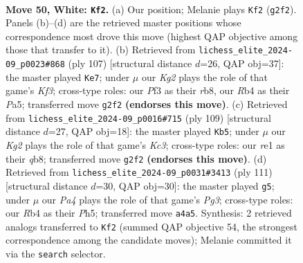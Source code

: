 \documentclass[11pt]{article}
\begin{document}
\clearpage

\begin{figure}[p]\centering
\begin{subfigure}{0.46\textwidth}\centering
\resizebox{\linewidth}{!}{%
\newchessgame
\chessboard[
  setfen={8/1R3p2/p3pk2/8/PR2P3/5P1P/6K1/4r3 w - - 6 50},
  showmover=false,
  pgfstyle=straightmove, color=movearrow, markmove={g2-f2}
]}
\caption{}
\end{subfigure}\hfill
\begin{subfigure}{0.46\textwidth}\centering
\resizebox{\linewidth}{!}{%
\newchessgame
\chessboard[
  setfen={1R6/8/5k2/p3prp1/8/r6P/4RPK1/8 b - - 7 54},
  showmover=false,
  pgfstyle=straightmove, color=movearrow, markmove={f6-e7}
]}
\caption{}
\end{subfigure}
\\[4pt]
\begin{subfigure}{0.46\textwidth}\centering
\resizebox{\linewidth}{!}{%
\newchessgame
\chessboard[
  setfen={1Q6/p4r2/1pk5/3p1r2/1P3P2/4P3/P3K3/8 b - - 0 55},
  showmover=false,
  pgfstyle=straightmove, color=movearrow, markmove={c6-b5}
]}
\caption{}
\end{subfigure}\hfill
\begin{subfigure}{0.46\textwidth}\centering
\resizebox{\linewidth}{!}{%
\newchessgame
\chessboard[
  setfen={8/6k1/R4pp1/5r1p/7P/6P1/5PK1/8 b - - 25 56},
  showmover=false,
  pgfstyle=straightmove, color=movearrow, markmove={g6-g5}
]}
\caption{}
\end{subfigure}
\caption{\textbf{Move 50, White: \texttt{Kf2}.} (a) Our position; Melanie plays \texttt{Kf2} (\texttt{g2f2}). Panels (b)--(d) are the retrieved master positions whose correspondence most drove this move (highest QAP objective among those that transfer to it). (b) Retrieved from \texttt{lichess\_elite\_2024-09\_p0023\#868} (ply 107) [structural distance $d$=26, QAP obj=37]: the master played \texttt{Ke7}; under $\mu$ our \emph{Kg2} plays the role of that game's \emph{Kf3}; cross-type roles: our \emph{P}f3 as their \emph{r}b8, our \emph{R}b4 as their \emph{P}a5; transferred move \texttt{g2f2} \textbf{(endorses this move)}. (c) Retrieved from \texttt{lichess\_elite\_2024-09\_p0016\#715} (ply 109) [structural distance $d$=27, QAP obj=18]: the master played \texttt{Kb5}; under $\mu$ our \emph{Kg2} plays the role of that game's \emph{Kc3}; cross-type roles: our \emph{r}e1 as their \emph{q}b8; transferred move \texttt{g2f2} \textbf{(endorses this move)}. (d) Retrieved from \texttt{lichess\_elite\_2024-09\_p0031\#3413} (ply 111) [structural distance $d$=30, QAP obj=30]: the master played \texttt{g5}; under $\mu$ our \emph{Pa4} plays the role of that game's \emph{Pg3}; cross-type roles: our \emph{R}b4 as their \emph{P}h5; transferred move \texttt{a4a5}. Synthesis: 2 retrieved analogs transferred to \texttt{Kf2} (summed QAP objective 54, the strongest correspondence among the candidate moves); Melanie committed it via the \texttt{search} selector.}
\label{fig:thought-m98}
\end{figure}
\end{document}
